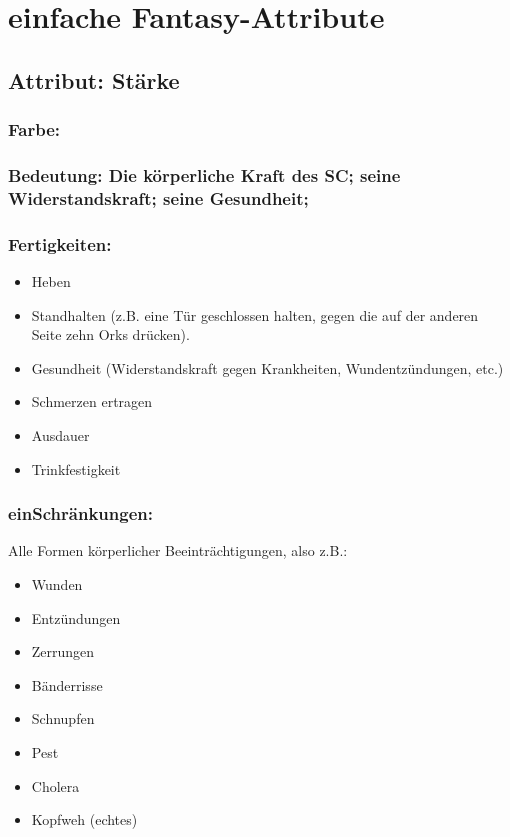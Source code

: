 \section{einfache Fantasy-Attribute}
\label{sect:einfacheFantasyAttribute}
\subsection{Attribut: Stärke}

\subsubsection{Farbe: \kreuz}

\subsubsection{Bedeutung: Die körperliche Kraft des SC; seine Widerstandskraft; seine Gesundheit;}

\subsubsection{Fertigkeiten:}
\begin{itemize}
\item Heben
\item Standhalten (z.B. eine Tür geschlossen halten, gegen die auf der anderen Seite zehn Orks drücken).
\item Gesundheit (Widerstandskraft gegen Krankheiten, Wundentzündungen, etc.)
\item Schmerzen ertragen
\item Ausdauer
\item Trinkfestigkeit
\end{itemize}

\subsubsection{einSchränkungen:}

Alle Formen körperlicher Beeinträchtigungen, also z.B.:
\begin{itemize}
\item Wunden
\item Entzündungen
\item Zerrungen
\item Bänderrisse
\item Schnupfen
\item Pest
\item Cholera
\item Kopfweh (echtes)
\end{itemize}

